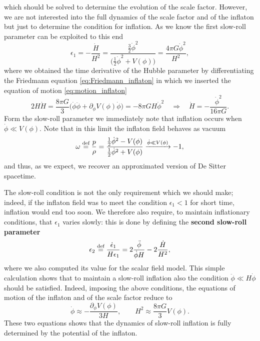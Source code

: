 which should be solved to determine the evolution of the scale factor. However, we are not interested into the full dynamics of the scale factor and of the inflaton but just to determine the condition for inflation. As we know the first slow-roll parameter can be exploited to this end
\begin{equation}
    \epsilon_1=-\frac{\dot H}{H^2}=\frac{\frac{3}{2}\dot\phi^2}{\big(\frac{1}{2}\dot\phi^2+V(\phi)\big)}=\frac{4\pi G\dot\phi^2}{H^2},\label{eq:SRP_field}
\end{equation}
where we obtained the time derivative of the Hubble parameter by differentiating the Friedmann equation \eqref{eq:Friedmann_inflaton} in which we inserted the equation of motion \eqref{eq:motion_inflaton}
$$2H\dot H=\frac{8\pi G}{3}\bigg(\dot\phi\ddot\phi+\partial_\phi V(\phi)\dot\phi\bigg)=-8\pi GH\dot \phi^2\quad\Rightarrow\quad \dot H=-\frac{\dot \phi^2}{16\pi G}.$$
Form the slow-roll parameter we immediately note that inflation occurs when $\dot \phi\ll V(\phi)$. Note that in this limit the inflaton field behaves as vacuum $$\omega\stackrel{\text{def}}{=}\frac{p}{\rho}=\frac{\frac{1}{2}\dot\phi^2-V(\phi)}{\frac{1}{2}\dot\phi^2+V(\phi)}\xrightarrow{\dot\phi\ll V(\phi)}-1,$$
and thus, as we expect, we recover an approximated version of De Sitter spacetime.

The slow-roll condition is not the only requirement which we should make; indeed, if the inflaton field was to meet the condition $\epsilon_1<1$ for short time, inflation would end too soon. We therefore also require, to maintain inflationary conditions, that $\epsilon_1$ varies slowly: this is done by defining the \textbf{second slow-roll parameter}
\begin{equation}
    \epsilon_2\stackrel{\text{def}}{=}\frac{\dot\epsilon_1}{H\epsilon_1}=2\frac{\ddot\phi}{\dot\phi H}-2\frac{\dot H}{H^2},\label{eq:second_sr_parameter}
\end{equation}
where we also computed its value for the scalar field model. This simple calculation shows that to maintain a slow-roll inflation also the condition $\ddot\phi\ll H\dot\phi$ should be satisfied. Indeed, imposing the above conditions, the equations of motion of the inflaton and of the scale factor reduce to
\begin{equation}
    \label{eq:SR_equation_motion}
    \dot\phi \approx-\frac{\partial_\phi V(\phi)}{3H},\qquad H^2\approx\frac{8\pi G}{3}V(\phi).
\end{equation}
These two equations shows that the dynamics of slow-roll inflation is fully determined by the potential of the inflaton. 
